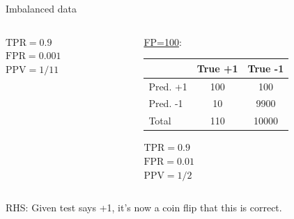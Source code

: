 \begin{vbframe}{Imbalanced data}
\begin{columns}
\begin{column}{0.45\textwidth}
 \medskip
 $\text{TPR} = 0.9$\\
 $\text{FPR} = 0.001$\\
 $\text{PPV} = 1/11$
\end{column}
\begin{column}{0.45\textwidth}
 \underline{FP=100}:\\
 \lz
 {
 \tiny
 \begin{tabular}{|l|c|c|}
                 \hline
                & True +1 & True -1 \\ \hline
 Pred. +1 & 100            & 100            \\ \hline
 Pred. -1 & 10            & 9900           \\ \hline
 Total  & 110            & 10000           \\ \hline
 \end{tabular}
 }

 \medskip
 $\text{TPR} = 0.9$\\
 $\text{FPR} = 0.01$\\
 $\text{PPV} = 1/2$
\end{column}
\end{columns}

\vfill

RHS: Given test says +1, it's now a coin flip that this is correct.




\framebreak



\end{vbframe}
